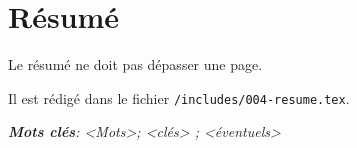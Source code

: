 \newpage

\section*{Résumé}
  
Le résumé ne doit pas dépasser une page.

Il est rédigé dans le fichier \texttt{/includes/004-resume.tex}.

\bigskip

\textbf{\emph{Mots clés}}\emph{: <Mots>; <clés> 
; <éventuels>}
